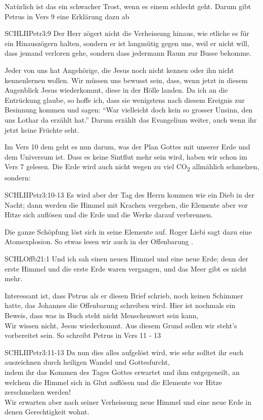 \documentclass[fontsize=16pt]{mybib}
\begin{document}
Natürlich ist das ein schwacher Trost, wenn es einem schlecht geht. Darum gibt Petrus in Vers 9 eine Erklärung dazu ab
\begin{bibelbox}{SCHL}{IIPetr}{3:9}
Der Herr zögert nicht die Verheissung hinaus, wie etliche es für ein Hinauszögern halten, sondern er ist langmütig gegen uns, weil er nicht will, dass jemand verloren gehe, sondern dass jedermann Raum zur Busse bekomme.
\end{bibelbox}

Jeder von uns hat Angehörige, die Jesus noch nicht kennen oder ihn nicht kennenlernen wollen. Wir müssen uns bewusst sein, dass, wenn jetzt in diesem Augenblick Jesus wiederkommt, diese in der Hölle landen. Da ich an die Entrückung glaube, so hoffe ich, dass sie wenigstens nach diesem Ereignis zur Besinnung kommen und sagen: \enquote{War vielleicht doch kein so grosser Unsinn, den uns Lothar da erzählt hat.} Darum erzählt das Evangelium weiter, auch wenn ihr jetzt keine Früchte seht.

Im Vers 10 dem geht es nun darum, was der Plan Gottes mit unserer Erde und dem Universum ist. Dass es keine Sintflut mehr sein wird, haben wir schon im Vers 7 gelesen. Die Erde wird auch nicht wegen zu viel CO\textsubscript{2} allmählich schmelzen, sondern:
\begin{bibelbox}{SCHL}{IIPetr}{3:10-13}
Es wird aber der Tag des Herrn kommen wie ein Dieb in der Nacht; dann werden die Himmel mit Krachen vergehen, die Elemente aber vor Hitze sich auflösen und die Erde und die Werke darauf verbrennen.
\end{bibelbox}
Die ganze Schöpfung löst sich in seine Elemente auf. Roger Liebi sagt dazu eine Atomexplosion.
So etwas lesen wir auch in der Offenbarung .
\begin{bibelbox}{SCHL}{Offb}{21:1}
  Und ich sah einen neuen Himmel und eine neue Erde; denn der erste Himmel und die erste Erde waren vergangen, und das Meer gibt es nicht mehr.
\end{bibelbox}
Interessant ist, dass Petrus als er diesen Brief schrieb, noch keinen Schimmer hatte, das Johannes die Offenbarung schreiben wird. Hier ist nochmals ein Beweis, dass  was in  Buch steht nicht Menschenwort sein kann, \\
Wir wissen nicht,  Jesus wiederkommt. Aus diesem Grund sollen wir steht's vorbereitet sein. So schreibt Petrus in Vers 11 - 13
\begin{bibelbox}{SCHL}{IIPetr}{3:11-13}
Da nun dies alles aufgelöst wird, wie sehr solltet ihr euch auszeichnen durch heiligen Wandel und Gottesfurcht,\\
indem ihr das Kommen des Tages Gottes erwartet und ihm entgegeneilt, an welchem die Himmel sich in Glut auflösen und die Elemente vor Hitze zerschmelzen werden!\\
Wir erwarten aber nach seiner Verheissung neue Himmel und eine neue Erde in denen Gerechtigkeit wohnt.
\end{bibelbox}
\end{document}
